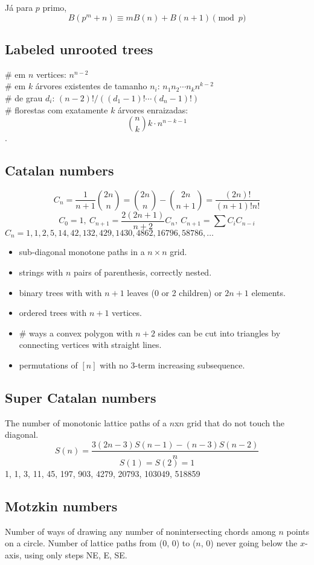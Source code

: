       Já para $p$ primo,
		\[ B(p^m+n)\equiv mB(n)+B(n+1) \pmod{p} \]

	\subsection{Labeled unrooted trees}
		\# em $n$ vertices: $n^{n-2}$\\
		\# em $k$ árvores existentes de tamanho $n_i$: $n_1n_2\cdots n_k n^{k-2}$ \\
		\# de grau $d_i$: $(n-2)! / ((d_1-1)! \cdots (d_n-1)!)$\\
		\# florestas com exatamente $k$ árvores enraizadas: $$\binom{n}{k} k \cdot n^{n-k-1}$$.
   
    
	\subsection{Catalan numbers}
		\[ C_n=\frac{1}{n+1}\binom{2n}{n}= \binom{2n}{n}-\binom{2n}{n+1} = \frac{(2n)!}{(n+1)!n!} \]
		\[ C_0=1,\ C_{n+1} = \frac{2(2n+1)}{n+2}C_n,\ C_{n+1}=\sum C_iC_{n-i} \]
		${C_n = 1, 1, 2, 5, 14, 42, 132, 429, 1430, 4862, 16796, 58786, \dots}$
		\begin{itemize}[noitemsep]
			\item sub-diagonal monotone paths in a $n\times n$ grid.
			\item strings with $n$ pairs of parenthesis, correctly nested.
			\item binary trees with with $n+1$ leaves (0 or 2 children) or $2n + 1$ elements.
			\item ordered trees with $n+1$ vertices.
			\item \# ways a convex polygon with $n+2$ sides can be cut into triangles by connecting vertices with straight lines.
			\item permutations of $[n]$ with no 3-term increasing subsequence.
		\end{itemize}

    \subsection{Super Catalan numbers}
    The number of monotonic lattice paths of a $n$x$n$ grid that do not touch the diagonal.\\
    $$S(n) = \frac{3(2n-3)S(n-1)-(n-3)S(n-2)}{n}$$
    $$S(1) = S(2) = 1$$
    1, 1, 3, 11, 45, 197, 903, 4279, 20793, 103049, 518859\\

    \subsection{Motzkin numbers}
    Number of ways of drawing any number of nonintersecting chords among $n$ points on a circle. Number of lattice paths from (0, 0) to ($n$, 0) never going below the $x$-axis, using only steps NE, E, SE.\\
   
